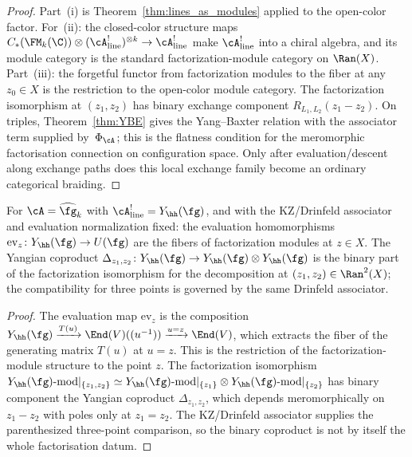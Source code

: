 \begin{proof}
Part~(i) is Theorem~\ref{thm:lines_as_modules} applied to the
open-color factor. For~(ii): the closed-color structure maps
$C_\ast(\FM_k(\C)) \otimes (\cA^!_{\mathrm{line}})^{\otimes k}
\to \cA^!_{\mathrm{line}}$
make $\cA^!_{\mathrm{line}}$ into a chiral algebra, and its module category
is the standard factorization-module category on $\Ran(X)$.
Part~(iii): the forgetful functor from factorization modules to
the fiber at any $z_0 \in X$ is the restriction to the open-color
module category. The factorization isomorphism at $(z_1, z_2)$
has binary exchange component $R_{L_1,L_2}(z_1-z_2)$. On triples,
Theorem~\ref{thm:YBE} gives the Yang--Baxter relation with the
associator term supplied by~$\Phi_\cA$; this is the flatness condition
for the meromorphic factorisation connection on configuration space.
Only after evaluation/descent along exchange paths does this local
exchange family become an ordinary categorical braiding.
\end{proof}

\begin{proposition}
\label{prop:spectral-families}
For $\cA = \widehat{\fg}_k$ with
$\cA^!_{\mathrm{line}} = Y_\hh(\fg)$, and with the KZ/Drinfeld
associator and evaluation normalization fixed:
the evaluation homomorphisms
$\mathrm{ev}_z \colon Y_\hh(\fg) \to U(\fg)$ are the fibers
of factorization modules at $z \in X$. The Yangian coproduct
$\Delta_{z_1,z_2} \colon Y_\hh(\fg) \to
Y_\hh(\fg) \otimes Y_\hh(\fg)$
is the binary part of the factorization isomorphism for the
decomposition at $(z_1, z_2) \in \Ran^2(X)$; the compatibility for
three points is governed by the same Drinfeld associator.
\end{proposition}

\begin{proof}
The evaluation map $\mathrm{ev}_z$ is the composition
$Y_\hh(\fg) \xrightarrow{T(u)} \End(V)((u^{-1}))
\xrightarrow{u=z} \End(V)$,
which extracts the fiber of the generating matrix $T(u)$ at
$u = z$. This is the restriction of the factorization-module
structure to the point $z$. The factorization isomorphism
$Y_\hh(\fg)\text{-mod} |_{\{z_1, z_2\}} \simeq
Y_\hh(\fg)\text{-mod} |_{\{z_1\}} \otimes
Y_\hh(\fg)\text{-mod} |_{\{z_2\}}$
has binary component the Yangian coproduct $\Delta_{z_1,z_2}$, which
depends meromorphically on $z_1 - z_2$ with poles only at
$z_1 = z_2$. The KZ/Drinfeld associator supplies the parenthesized
three-point comparison, so the binary coproduct is not by itself the
whole factorisation datum.
\end{proof}

